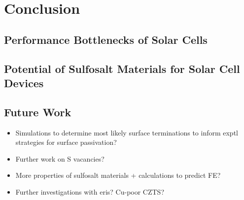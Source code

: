
\chapter{Conclusion}

\label{ch:conclusions}

\section{Performance Bottlenecks of  \CZTS Solar Cells}
\section{Potential of Sulfosalt Materials for Solar Cell Devices}

\section{Future Work}

\begin{itemize}
\item Simulations to determine most likely surface terminations to inform exptl strategies for surface passivation?
\item Further work on S vacancies?
\item More properties of sulfosalt materials + calculations to predict FE?
\item Further investigations with eris? Cu-poor CZTS?
\end{itemize}

 